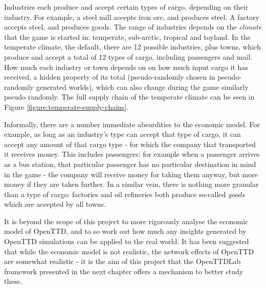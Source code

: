 \documentclass[logo,msc,dsti]{infthesis}    %
\begin{document}
Industries each produce and accept certain types of cargo, depending on their industry. For example, a steel mill accepts iron ore, and produces steel. A factory accepts steel, and produces goods. The range of industries depends on the \emph{climate} that the game is started in: temperate, sub-arctic, tropical and toyland. In the temperate climate, the default, there are 12 possible industries, plus towns, which produce and accept a total of 12 types of cargo, including passengers and mail. How much each industry or town depends on on how much input cargo it has received, a hidden property of its total (pseudo-randomly chosen in pseudo-randomly generated worlds), which can also change during the game similarly pseudo randomly. The full supply chain of the temperate climate can be seen in Figure \ref{figure:temperate-supply-chains}.

Informally, there are a number immediate absurdities to the economic model. For example, as long as an industry's type can accept that type of cargo, it can accept any amount of that cargo type - for which the company that transported it receives money. This includes passengers: for example when a passenger arrives as a bus station, that particular passenger has no particular destination in mind in the game - the company will receive money for taking them anyway, but more money if they are taken further. In a similar vein, there is nothing more granular than a type of cargo: factories and oil refineries both produce so-called \emph{goods} which are accepted by all towns.

It is beyond the scope of this project to more rigorously analyse the economic model of OpenTTD, and to so work out how much any insights generated by OpenTTD simulations can be applied to the real world. It has been suggested that while the economic model is not realistic, the network effects of OpenTTD are somewhat realistic \cite{raghothama2013review} - it is the aim of this project that the OpenTTDLab framework presented in the next chapter offers a mechanism to better study these.
\end{document}
